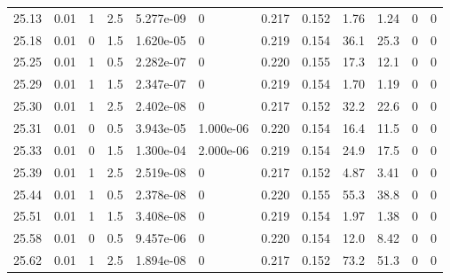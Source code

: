\documentclass[preview]{standalone}
\begin{document}
{{{{{{{{{{{\begin{tabular}{L{1.2cm}C{1.2cm} C{0.3cm}C{0.5cm} C{1.4cm}C{1.4cm} C{1.4cm}C{1.4cm} C{1.6cm}C{1.6cm} C{1.6cm}C{1.6cm}}
  25.13  &  0.01  & 1     & 2.5 &  5.277e-09  & 0  &  0.217&   0.152& 1.76 & 1.24   &  0 & 0  \\ 
  25.18  &  0.01  & 0     & 1.5 &  1.620e-05  & 0  &  0.219&   0.154& 36.1 & 25.3   &  0 & 0  \\ 
  25.25  &  0.01  & 1     & 0.5 &  2.282e-07  & 0  &  0.220&   0.155& 17.3 & 12.1   &  0 & 0  \\ 
  25.29  &  0.01  & 1     & 1.5 &  2.347e-07  & 0  &  0.219&   0.154& 1.70 & 1.19   &  0 & 0  \\ 
  25.30  &  0.01  & 1     & 2.5 &  2.402e-08  & 0  &  0.217&   0.152& 32.2 & 22.6   &  0 & 0  \\ 
  25.31  &  0.01  & 0     & 0.5 &  3.943e-05  & 1.000e-06  &  0.220&   0.154& 16.4 & 11.5   &  0 & 0  \\ 
  25.33  &  0.01  & 0     & 1.5 &  1.300e-04  & 2.000e-06  &  0.219&   0.154& 24.9 & 17.5   &  0 & 0  \\ 
  25.39  &  0.01  & 1     & 2.5 &  2.519e-08  & 0  &  0.217&   0.152& 4.87 & 3.41   &  0 & 0  \\ 
  25.44  &  0.01  & 1     & 0.5 &  2.378e-08  & 0  &  0.220&   0.155& 55.3 & 38.8   &  0 & 0  \\ 
  25.51  &  0.01  & 1     & 1.5 &  3.408e-08  & 0  &  0.219&   0.154& 1.97 & 1.38   &  0 & 0  \\ 
  25.58  &  0.01  & 0     & 0.5 &  9.457e-06  & 0  &  0.220&   0.154& 12.0 & 8.42   &  0 & 0  \\ 
  25.62  &  0.01  & 1     & 2.5 &  1.894e-08  & 0  &  0.217&   0.152& 73.2 & 51.3   &  0 & 0  \\ 
\hline 
\end{tabular} 

}}}}}}}}}}}
\end{document}
